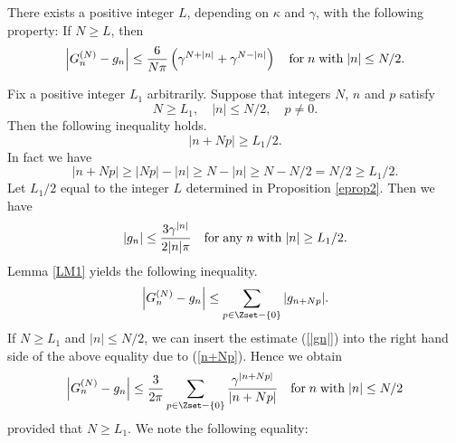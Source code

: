 \begin{prop}
\label{eprop3}
There exists a positive integer $L$, depending on $\kappa$ and $\gamma$, with the following property: If $N \ge L$, then
\begin{eqnarray*}
\left|G^{(N)}_n-g_n\right| \le \displaystyle \frac{6}{N\pi}\left(\gamma^{N+|n|}+\gamma^{N-|n|}\right) \quad{\rm for}\; n \;{\rm with}\;  |n| \le N/2.
\nonumber
\end{eqnarray*}
\end{prop}
\begin{pf}
Fix a positive integer $L_1$ arbitrarily. Suppose that integers $N$, $n$ and $p$ satisfy
\begin{displaymath}
N \ge L_1, \quad |n| \le N/2, \quad p \ne 0.
\end{displaymath}
Then the following inequality holds.
\begin{equation}
|n+Np| \ge L_1/2.
\label{n+Np}
\end{equation}
In fact we have
\begin{displaymath}
|n+Np| \ge |Np|-|n|\ge N-|n| \ge N-N/2=N/2 \ge L_1/2.
\end{displaymath}
Let $L_1/2$ equal to the integer $L$ determined in Proposition \ref{eprop2}. Then we have
\begin{equation}
|g_n| \le \frac{3\gamma^{|n|}}{2|n|\pi} \quad {\rm for}\;{\rm any}\; n \;{\rm with}\; |n| \ge L_1/2.
\label{|gn|}
\end{equation}
Lemma \ref{LM1} yields the following inequality.
\begin{displaymath}
\left|G^{(N)}_n-g_n\right| \le \displaystyle \sum _{p \in \Zset-\{0\}} |g_{n+Np}|.
\end{displaymath}
If $N\ge L_1$ and $|n|\le N/2$, we can insert the estimate (\ref{|gn|}) into the right hand side of the above equality due to (\ref{n+Np}).
Hence we obtain
\begin{eqnarray}
\begin{array}{ll}
\left|G^{(N)}_n-g_n\right| \le \displaystyle \frac{3}{2\pi}\sum _{p \in \Zset-\{0\}} \frac{\gamma^{|n+Np|}}{|n+Np|} 
\quad {\rm for}\;n\;{\rm with}\;|n| \le N/2
\end{array}
\label{Gn-gn <=}
\end{eqnarray}
provided that $N \ge L_1$. We note the following equality:
\begin{eqnarray*}
\begin{array}{ll}

\end{array}
\end{eqnarray*}
\end{pf}
